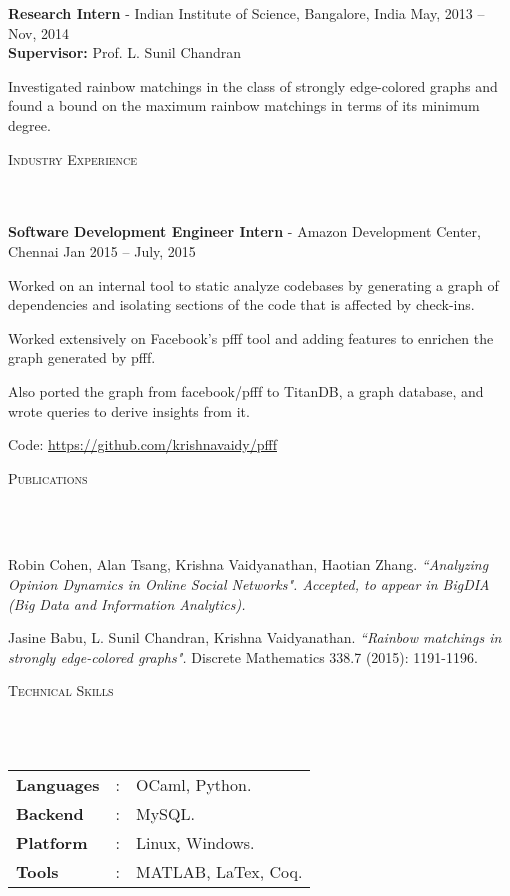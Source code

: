\documentclass{article}
\newcommand{\header}[1]{{
\hspace*{-15pt}\vspace*{6pt} \textsc{#1}} \vspace*{-6pt} 
\lineunder
}
\newcommand{\lineunder}{
\vspace*{-8pt} \\ \hspace*{-18pt} 
\hrulefill \\
}
\newcommand{\employer}[4]{{
\vspace*{2pt}%
\textbf{#1} - #2 \hfill #3\\ #4 \vspace*{2pt}}
}
\renewcommand{\labelitemii}{
$\vcenter{\hbox{\tiny$\bullet$}}$\hspace*{-3pt}
}
\newenvironment{bullet-list-major}{
\begin{list}{\labelitemii}{\setlength\leftmargin{3pt} 
\topsep 0pt \itemsep -2pt}}{\vspace*{4pt}\end{list}
}
\newenvironment{bullet-list-minor}{
\begin{list}{\labelitemii}{\setlength\leftmargin{15pt} 
\topsep 0pt \itemsep -2pt}}{\vspace*{4pt}\end{list}
}
\begin{document}
\employer{Research Intern}{Indian Institute of Science, Bangalore, India}{May,
    2013 -- Nov, 2014}{\textbf{Supervisor:} Prof. L. Sunil Chandran}
\begin{bullet-list-minor}
\item Investigated rainbow matchings in the class of strongly edge-colored graphs and found a bound on the maximum rainbow matchings in terms of its minimum degree.
\end{bullet-list-minor}

\vspace*{4pt}%
\header{Industry Experience}
    \employer{Software Development Engineer Intern}{Amazon Development Center,
        Chennai}{Jan 2015 -- July,
        2015}{}
	\begin{bullet-list-minor}
        \item Worked on an internal tool to static analyze codebases by
            generating a graph of dependencies and isolating sections of the code
            that is affected by check-ins. 
        \item Worked extensively on Facebook's pfff tool and
            adding features to enrichen the graph generated by pfff.
        \item Also ported the graph from facebook/pfff to TitanDB, a graph
            database, and wrote queries to derive insights from it.
        \item Code: \url{https://github.com/krishnavaidy/pfff}
    \end{bullet-list-minor}

\vspace*{4pt}%
\header{Publications}
\begin{bullet-list-major}
\item Robin Cohen, Alan Tsang, Krishna Vaidyanathan, Haotian Zhang. 
    \textit{``Analyzing Opinion Dynamics in Online Social Networks". Accepted, to appear in 
        BigDIA (Big Data and Information Analytics).} 
\item Jasine  Babu,  L.  Sunil  Chandran, Krishna  Vaidyanathan.
    \textit{``Rainbow matchings in strongly edge-colored graphs".} Discrete Mathematics 338.7 (2015):  1191-1196.
\end{bullet-list-major}

\vspace*{4pt}%
\header{Technical Skills}
\begin{tabular}{l l l}

\textbf{Languages}&: & OCaml, Python.\\
\textbf{Backend}&:	& MySQL.\\
\textbf{Platform}&:  & Linux, Windows.\\
\textbf{Tools}&:     &MATLAB, LaTex, Coq.\\
\end{tabular}
\end{document}
